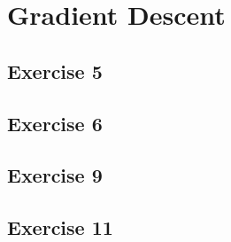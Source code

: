 \documentclass[twoside,11pt]{article}
\begin{document}
\section{Gradient Descent}

\subsection{Exercise 5}

\subsection{Exercise 6}

\subsection{Exercise 9}

\subsection{Exercise 11}
	
\end{document}

